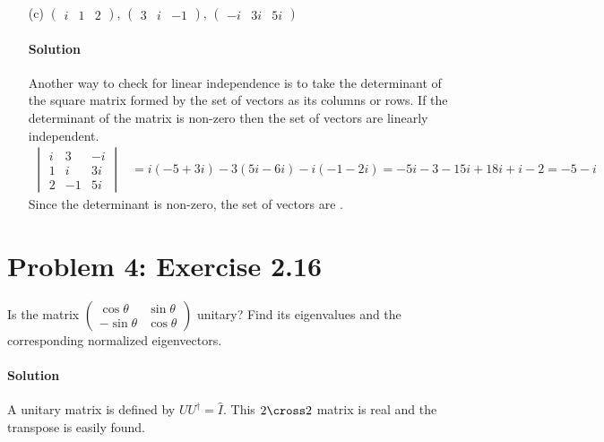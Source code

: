 \documentclass{article}
\begin{document}
\begin{enumerate}
		\item[(c)] 
		$\begin{pmatrix} i & 1 & 2 \end{pmatrix}$,
		$\begin{pmatrix} 3 & i & -1 \end{pmatrix}$,
		$\begin{pmatrix} -i & 3i & 5i \end{pmatrix}$
		\paragraph{Solution} Another way to check for linear independence is to take the determinant of the square matrix formed by the set of vectors as its columns or rows. If the determinant of the matrix is non-zero then the set of vectors are linearly independent.
		\begin{align*}
			\begin{vmatrix}
				i & 3 & -i \\
				1 & i & 3i \\
				2 & -1 & 5i 
			\end{vmatrix}
			&= i(-5 + 3i) - 3(5i - 6i) - i(-1 - 2i) = -5i -3 - 15i + 18i + i - 2 = \boxed{-5-i}
		\end{align*}
		Since the determinant is non-zero, the set of vectors are .
		
	\end{enumerate}
	
\clearpage
	
	\section*{Problem 4: Exercise 2.16}
	Is the matrix
	$ \begin{pmatrix}
		\cos \theta & \sin \theta \\
		-\sin \theta & \cos \theta 
	\end{pmatrix} $ unitary? Find its eigenvalues and the corresponding normalized eigenvectors.
	\paragraph{Solution} A unitary matrix is defined by $UU^{\dagger} = \hat{I}$. This $2 \cross 2$ matrix is real and the transpose is easily found.
\end{document}
